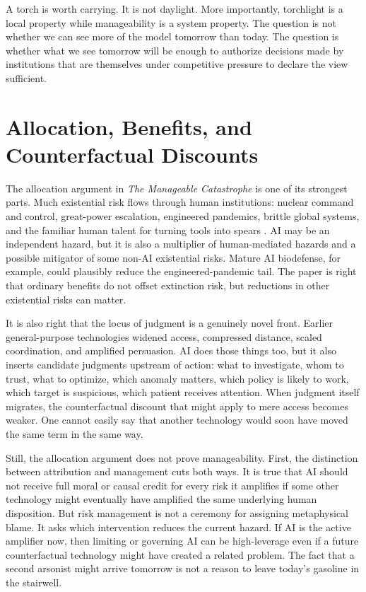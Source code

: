 \documentclass[11pt]{article}
\begin{document}
A torch is worth carrying. It is not daylight. More importantly, torchlight is a local property while manageability is a system property. The question is not whether we can see more of the model tomorrow than today. The question is whether what we see tomorrow will be enough to authorize decisions made by institutions that are themselves under competitive pressure to declare the view sufficient.

\section{Allocation, Benefits, and Counterfactual Discounts}
\label{sec:allocation}

The allocation argument in \textit{The Manageable Catastrophe} is one of its strongest parts. Much existential risk flows through human institutions: nuclear command and control, great-power escalation, engineered pandemics, brittle global systems, and the familiar human talent for turning tools into spears \citep{ord2020}. AI may be an independent hazard, but it is also a multiplier of human-mediated hazards and a possible mitigator of some non-AI existential risks. Mature AI biodefense, for example, could plausibly reduce the engineered-pandemic tail. The paper is right that ordinary benefits do not offset extinction risk, but reductions in other existential risks can matter.

It is also right that the locus of judgment is a genuinely novel front. Earlier general-purpose technologies widened access, compressed distance, scaled coordination, and amplified persuasion. AI does those things too, but it also inserts candidate judgments upstream of action: what to investigate, whom to trust, what to optimize, which anomaly matters, which policy is likely to work, which target is suspicious, which patient receives attention. When judgment itself migrates, the counterfactual discount that might apply to mere access becomes weaker. One cannot easily say that another technology would soon have moved the same term in the same way.

Still, the allocation argument does not prove manageability. First, the distinction between attribution and management cuts both ways. It is true that AI should not receive full moral or causal credit for every risk it amplifies if some other technology might eventually have amplified the same underlying human disposition. But risk management is not a ceremony for assigning metaphysical blame. It asks which intervention reduces the current hazard. If AI is the active amplifier now, then limiting or governing AI can be high-leverage even if a future counterfactual technology might have created a related problem. The fact that a second arsonist might arrive tomorrow is not a reason to leave today's gasoline in the stairwell.
\end{document}
